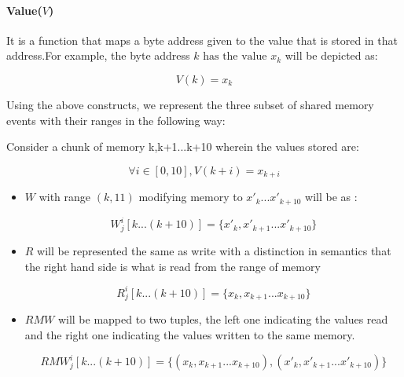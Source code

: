             
         \paragraph{Value($V$)}  
           It is a function that maps a byte address given to the value that is stored in that address.For example, the byte address $k \text{ has the value } x_k$ will be depicted as:
                
                \[V(k) = x_k\]
            
        
        

            Using the above constructs, we represent the three subset of shared memory events with their ranges in the following way:
            
            Consider a chunk of memory {k,k+1...k+10} wherein the values stored are:
            
                \[\forall i \in [0,10], V(k+i) = x_{k+i}\]
                
            \begin{itemize}
                \item $W$ with range $(k,11)$ modifying memory to ${x'_{k}}...{x'_{k+10}}$ will be as : 
                
                        \[{W^i_j}[k...(k+10)] = \{x'_{k}, x'_{k+1}...x'_{k + 10}\}\]
                
                \item $R$ will be represented the same as write with a distinction in semantics that the right hand side is what is read from the range of memory 
                
                        \[{R^i_j}[k...(k+10)] = \{x_{k}, x_{k+1}...x_{k + 10}\}\]
                
                \item $RMW$ will be mapped to two tuples, the left one indicating the values read and the right one indicating the values written to the same memory. 
                
                        \[{RMW^i_j}[k...(k+10)] = \{(x_{k}, x_{k+1}...x_{k + 10}), (x{'}_{k}, x{'}_{k+1}...x{'}_{k + 10}) \}\]
                
            \end{itemize}
            
